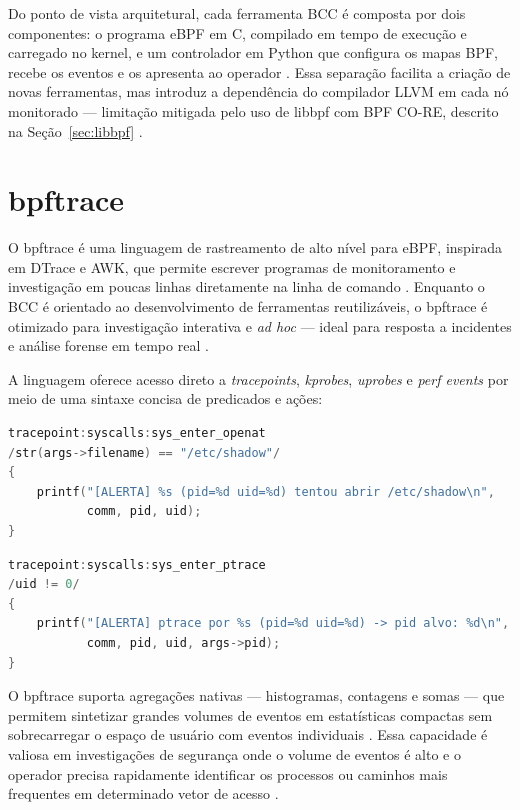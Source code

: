 Do ponto de vista arquitetural, cada ferramenta BCC é composta por dois componentes:
o programa eBPF em C, compilado em tempo de execução e carregado no kernel, e um
controlador em Python que configura os mapas BPF, recebe os eventos e os apresenta
ao operador \cite{bcc}.
Essa separação facilita a criação de novas ferramentas, mas introduz a dependência
do compilador LLVM em cada nó monitorado --- limitação mitigada pelo uso de libbpf
com BPF CO-RE, descrito na Seção~\ref{sec:libbpf} \cite{nakryiko2020}.

\section{bpftrace}

O bpftrace é uma linguagem de rastreamento de alto nível para eBPF, inspirada em
DTrace e AWK, que permite escrever programas de monitoramento e investigação em
poucas linhas diretamente na linha de comando \cite{bpftrace}.
Enquanto o BCC é orientado ao desenvolvimento de ferramentas reutilizáveis, o
bpftrace é otimizado para investigação interativa e \textit{ad hoc} --- ideal
para resposta a incidentes e análise forense em tempo real \cite{gregg2019}.

A linguagem oferece acesso direto a \textit{tracepoints}, \textit{kprobes},
\textit{uprobes} e \textit{perf events} por meio de uma sintaxe concisa de
predicados e ações:

\begin{lstlisting}[language=C,
  caption={Monitoramento de tentativas de abertura de \texttt{/etc/shadow}
           com bpftrace.}]
tracepoint:syscalls:sys_enter_openat
/str(args->filename) == "/etc/shadow"/
{
    printf("[ALERTA] %s (pid=%d uid=%d) tentou abrir /etc/shadow\n",
           comm, pid, uid);
}
\end{lstlisting}

\begin{lstlisting}[language=C,
  caption={Detecção de uso de \texttt{ptrace} por processos não privilegiados.}]
tracepoint:syscalls:sys_enter_ptrace
/uid != 0/
{
    printf("[ALERTA] ptrace por %s (pid=%d uid=%d) -> pid alvo: %d\n",
           comm, pid, uid, args->pid);
}
\end{lstlisting}

O bpftrace suporta agregações nativas --- histogramas, contagens e somas --- que
permitem sintetizar grandes volumes de eventos em estatísticas compactas sem
sobrecarregar o espaço de usuário com eventos individuais \cite{bpftrace}.
Essa capacidade é valiosa em investigações de segurança onde o volume de eventos
é alto e o operador precisa rapidamente identificar os processos ou caminhos
mais frequentes em determinado vetor de acesso \cite{gregg2020}.

